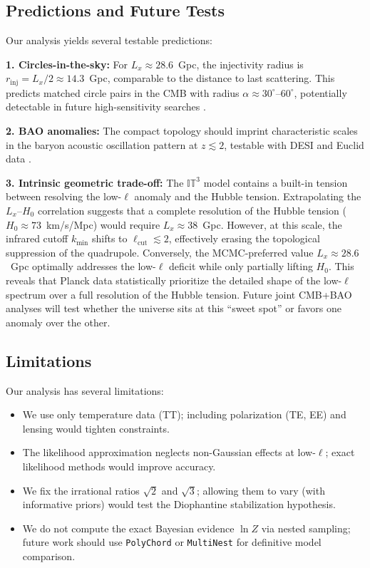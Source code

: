 \documentclass[a4paper,11pt]{article}
\begin{document}
\subsection{Predictions and Future Tests}

Our analysis yields several testable predictions:

\textbf{1. Circles-in-the-sky:} For $L_x \approx 28.6$~Gpc, the injectivity radius is $r_{\text{inj}} = L_x/2 \approx 14.3$~Gpc, comparable to the distance to last scattering. This predicts matched circle pairs in the CMB with radius $\alpha \approx 30^\circ\text{--}60^\circ$, potentially detectable in future high-sensitivity searches \citep{Circles2004}.

\textbf{2. BAO anomalies:} The compact topology should imprint characteristic scales in the baryon acoustic oscillation pattern at $z \lesssim 2$, testable with DESI and Euclid data \citep{DESI2024}.

\textbf{3. Intrinsic geometric trade-off:} 
The $\mathbb{IT}^3$ model contains a built-in tension between resolving the low-$\ell$ anomaly and the Hubble tension. Extrapolating the $L_x$--$H_0$ correlation suggests that a complete resolution of the Hubble tension ($H_0 \approx 73$~km/s/Mpc) would require $L_x \approx 38$~Gpc. However, at this scale, the infrared cutoff $k_{\min}$ shifts to $\ell_{\text{cut}} \lesssim 2$, effectively erasing the topological suppression of the quadrupole. Conversely, the MCMC-preferred value $L_x \approx 28.6$~Gpc optimally addresses the low-$\ell$ deficit while only partially lifting $H_0$. This reveals that Planck data statistically prioritize the detailed shape of the low-$\ell$ spectrum over a full resolution of the Hubble tension. Future joint CMB+BAO analyses will test whether the universe sits at this ``sweet spot'' or favors one anomaly over the other.

\subsection{Limitations}

Our analysis has several limitations:
\begin{itemize}
    \item We use only temperature data (TT); including polarization (TE, EE) and lensing would tighten constraints.
    
    \item The likelihood approximation neglects non-Gaussian effects at low-$\ell$; exact likelihood methods would improve accuracy.
    
    \item We fix the irrational ratios $\sqrt{2}$ and $\sqrt{3}$; allowing them to vary (with informative priors) would test the Diophantine stabilization hypothesis.
    
    \item We do not compute the exact Bayesian evidence $\ln Z$ via nested sampling; future work should use \texttt{PolyChord} or \texttt{MultiNest} for definitive model comparison.
\end{itemize}
\end{document}
